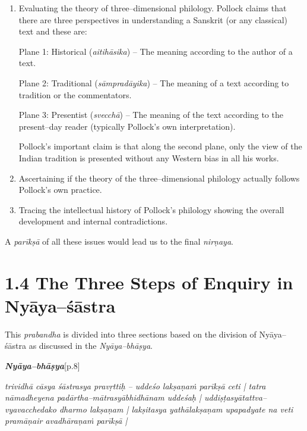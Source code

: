 \begin{enumerate}
\itemsep=0pt
\item 
 Evaluating the theory of three–dimensional philology. Pollock claims that there are three perspectives in understanding a Sanskrit (or any classical) text and these are:

\begin{myquote}
Plane 1: Historical (\textit{aitihāsika}) – The meaning according to the author of a text.
\end{myquote}

\begin{myquote}
Plane 2: Traditional (\textit{sāmpradāyika}) – The meaning of a text according to tradition or the commentators.
\end{myquote}

\begin{myquote}
Plane 3: Presentist (\textit{svecchā}) – The meaning of the text according to the present–day reader (typically Pollock’s own interpretation).
\end{myquote}

 Pollock’s important claim is that along the second plane, only the view of the Indian tradition is presented without any Western bias in all his works.

 \item Ascertaining if the theory of the three–dimensional philology actually follows Pollock’s own practice.

 \item Tracing the intellectual history of Pollock’s philology showing the overall development and internal contradictions.

\end{enumerate}

A \textit{parīkṣā} of all these issues would lead us to the final \textit{nirṇaya}.

\vspace{-.3cm}

\section*{1.4 The Three Steps of Enquiry in Nyāya–śāstra}

This \textit{prabandha} is divided into three sections based on the division of Nyāya–śāstra as discussed in the \textit{Nyāya–bhāṣya}.

\textit{\textbf{Nyāya–bhāṣya}}[p.8]

\begin{myquote}
\textit{trividhā cāsya śāstrasya pravṛttiḥ – uddeśo lakṣaṇaṁ parīkṣā ceti | tatra nāmadheyena padārtha–mātrasyābhidhānam uddeśaḥ | uddiṣṭasyātattva–vyavacchedako dharmo lakṣaṇam | lakṣitasya yathālakṣaṇam upapadyate na veti pramāṇair avadhāraṇaṁ parīkṣā |}
\end{myquote}

